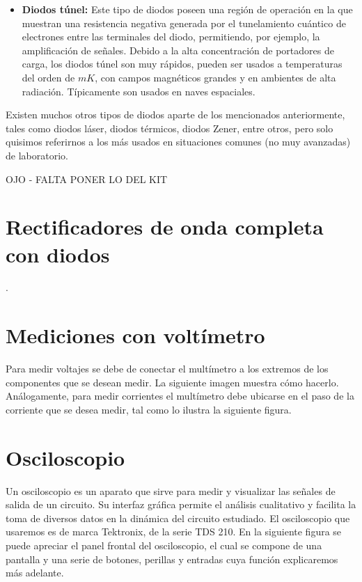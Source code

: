 \documentclass{scrartcl}
\begin{document}
\begin{itemize}
	\item \textbf{Diodos túnel:} Este tipo de diodos poseen una región de operación en la que muestran una resistencia negativa generada por el tunelamiento cuántico de electrones entre las terminales del diodo, permitiendo, por ejemplo, la amplificación de señales. Debido a la alta concentración de portadores de carga, los diodos túnel	son muy rápidos, pueden ser usados a temperaturas del orden de $mK$, con campos magnéticos grandes y en ambientes de alta radiación. Típicamente son usados en naves espaciales.

\end{itemize}

Existen muchos otros tipos de diodos aparte de los mencionados anteriormente, tales como diodos láser, diodos térmicos, diodos Zener, entre otros, pero solo quisimos referirnos a los más usados en situaciones comunes (no muy avanzadas) de laboratorio.

OJO - FALTA PONER LO DEL KIT	

\section{Rectificadores de onda completa con diodos}

.
\\



\section{Mediciones con voltímetro}

Para medir voltajes se debe de conectar el multímetro a los extremos de los componentes que se desean medir. La siguiente imagen muestra cómo hacerlo.
\\ 


Análogamente, para medir corrientes el multímetro debe ubicarse en el paso de la corriente que se desea medir, tal como lo ilustra la siguiente figura.
\\ 


\section{Osciloscopio}
Un osciloscopio es un aparato que sirve para medir y visualizar las señales de salida de un circuito. Su interfaz gráfica permite el análisis cualitativo y facilita la toma de diversos datos en la dinámica del circuito estudiado. El osciloscopio que usaremos es de marca Tektronix, de la serie TDS 210. En la siguiente figura se puede apreciar el panel frontal del osciloscopio, el cual se compone de una pantalla y una serie de botones, perillas y entradas cuya función explicaremos más adelante.\\
\end{document}
